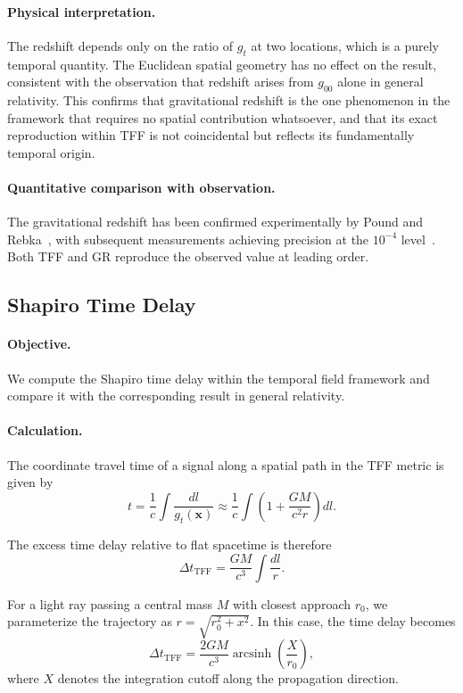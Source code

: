 \documentclass[12pt]{article}
\begin{document}
\paragraph{Physical interpretation.}
The redshift depends only on the ratio of $g_t$ at two locations, which is a purely temporal quantity. The Euclidean spatial geometry has no effect on the result, consistent with the observation that redshift arises from $g_{00}$ alone in general relativity. This confirms that gravitational redshift is the one phenomenon in the framework that requires no spatial contribution whatsoever, and that its exact reproduction within TFF is not coincidental but reflects its fundamentally temporal origin.

\paragraph{Quantitative comparison with observation.} 
The gravitational redshift has been confirmed experimentally by Pound and Rebka~\cite{Pound1959}, with subsequent measurements achieving precision at the $10^{-4}$ level~\cite{Pound1965}. Both TFF and GR reproduce the observed value at leading order.

\subsection{Shapiro Time Delay}
\label{sec:shapiro}

\paragraph{Objective.}
We compute the Shapiro time delay within the temporal field framework and compare it with the corresponding result in general relativity.

\paragraph{Calculation.}
The coordinate travel time of a signal along a spatial path in the TFF metric is given by
\begin{equation}
t = \frac{1}{c}\int \frac{dl}{g_t(\mathbf{x})} \approx \frac{1}{c}\int\left(1 + \frac{GM}{c^2 r}\right)dl .
\end{equation}

The excess time delay relative to flat spacetime is therefore
$$
\Delta t_{\text{TFF}} = \frac{GM}{c^3}\int \frac{dl}{r} .
$$

For a light ray passing a central mass $M$ with closest approach $r_0$, we parameterize the trajectory as $r = \sqrt{r_0^2 + x^2}$. In this case, the time delay becomes
\begin{equation}
\Delta t_{\text{TFF}} = \frac{2GM}{c^3}\operatorname{arcsinh}\left(\frac{X}{r_0}\right) ,
\label{eq:shapiro_tff}
\end{equation}
where $X$ denotes the integration cutoff along the propagation direction.
\end{document}
